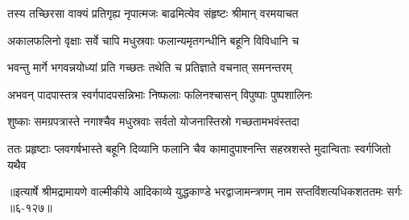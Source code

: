 \twolineshloka
{तस्य तच्छिरसा वाक्यं प्रतिगृह्य नृपात्मजः}
{बाढमित्येव संहृष्टः श्रीमान् वरमयाचत} %

\twolineshloka
{अकालफलिनो वृक्षाः सर्वे चापि मधुस्रवाः}
{फलान्यमृतगन्धीनि बहूनि विविधानि च} %

\twolineshloka
{भवन्तु मार्गे भगवन्नयोध्यां प्रति गच्छतः}
{तथेति च प्रतिज्ञाते वचनात् समनन्तरम्} %

\twolineshloka
{अभवन् पादपास्तत्र स्वर्गपादपसन्निभाः}
{निष्फलाः फलिनश्चासन् विपुष्पाः पुष्पशालिनः} %

\twolineshloka
{शुष्काः समग्रपत्रास्ते नगाश्चैव मधुस्रवाः}
{सर्वतो योजनास्तिस्रो गच्छतामभवंस्तदा} %

\twolineshloka
{ततः प्रहृष्टाः प्लवगर्षभास्ते बहूनि दिव्यानि फलानि चैव}
{कामादुपाश्नन्ति सहस्रशस्ते मुदान्विताः स्वर्गजितो यथैव} %


॥इत्यार्षे श्रीमद्रामायणे वाल्मीकीये आदिकाव्ये युद्धकाण्डे भरद्वाजामन्त्रणम् नाम सप्तविंशत्यधिकशततमः सर्गः ॥६-१२७॥
